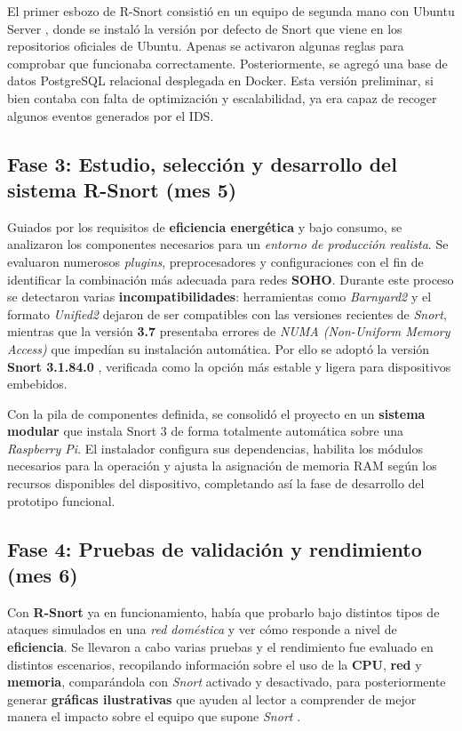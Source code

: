 \documentclass[11pt,a4paper,twoside]{report}
\begin{document}
El primer esbozo de R-Snort consistió en un equipo de segunda mano con Ubuntu Server \cite{insani2023implementation}, donde se instaló la versión por defecto de Snort que viene en los repositorios oficiales de Ubuntu. Apenas se activaron algunas reglas para comprobar que funcionaba correctamente. Posteriormente, se agregó una base de datos PostgreSQL relacional \cite{gkamas2022performance} desplegada en Docker. Esta versión preliminar, si bien contaba con falta de optimización y escalabilidad, ya era capaz de recoger algunos eventos generados por el IDS.

\subsection{Fase 3: Estudio, selección y desarrollo del sistema R-Snort (mes 5)}

Guiados por los requisitos de \textbf{eficiencia energética} y bajo consumo, se analizaron los componentes necesarios para un \textit{entorno de producción realista}. Se evaluaron numerosos \textit{plugins}, preprocesadores y configuraciones con el fin de identificar la combinación más adecuada para redes \textbf{SOHO}. Durante este proceso se detectaron varias \textbf{incompatibilidades}: herramientas como \textit{Barnyard2} \cite{o2015snort} y el formato \textit{Unified2} dejaron de ser compatibles con las versiones recientes de \textit{Snort}, mientras que la versión \textbf{3.7} presentaba errores de \textit{NUMA (Non-Uniform Memory Access)} que impedían su instalación automática. Por ello se adoptó la versión \textbf{Snort 3.1.84.0} \cite{snort3_3184}, verificada como la opción más estable y ligera para dispositivos embebidos.\newline

Con la pila de componentes definida, se consolidó el proyecto en un \textbf{sistema modular} que instala Snort 3 de forma totalmente automática sobre una \textit{Raspberry Pi}. El instalador configura sus dependencias, habilita los módulos necesarios para la operación y ajusta la asignación de memoria RAM según los recursos disponibles del dispositivo, completando así la fase de desarrollo del prototipo funcional.

\subsection{Fase 4: Pruebas de validación y rendimiento (mes 6)}

Con \textbf{R-Snort} ya en funcionamiento, había que probarlo bajo distintos tipos de ataques simulados en una \textit{red doméstica} y ver cómo responde a nivel de \textbf{eficiencia}. Se llevaron a cabo varias pruebas y el rendimiento fue evaluado en distintos escenarios, recopilando información sobre el uso de la \textbf{CPU}, \textbf{red} y \textbf{memoria}, comparándola con \textit{Snort} activado y desactivado, para posteriormente generar \textbf{gráficas ilustrativas} que ayuden al lector a comprender de mejor manera el impacto sobre el equipo que supone \textit{Snort} \cite{kuruvila2022explainable}.
\end{document}
